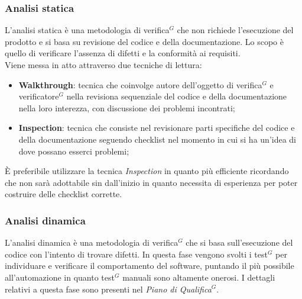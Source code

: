 \documentclass[a4paper,10pt]{article}
\begin{document}
\subsubsection{Analisi statica}
L'analisi statica è una metodologia di verifica$^G$ che non richiede l'esecuzione del prodotto e si basa su revisione del codice e della documentazione.
Lo scopo è quello di verificare l'assenza di difetti e la conformità ai requisiti. \\
Viene messa in atto attraverso due tecniche di lettura: 
\begin{itemize}
  \item \textbf{Walkthrough}: tecnica che coinvolge autore dell'oggetto di verifica$^G$ e verificatore$^G$ nella revisiona sequenziale del codice e
  della documentazione nella loro interezza, con discussione dei problemi incontrati;
  \item \textbf{Inspection}: tecnica che consiste nel revisionare parti specifiche del codice e della documentazione seguendo checklist nel momento 
  in cui si ha un'idea di dove possano esserci problemi;
\end{itemize}
È preferibile utilizzare la tecnica \textit{Inspection} in quanto più efficiente ricordando che non sarà adottabile sin dall'inizio
in quanto necessita di esperienza per poter costruire delle checklist corrette.
\subsubsection{Analisi dinamica}
L'analisi dinamica è una metodologia di verifica$^G$ che si basa sull'esecuzione del codice con l'intento di trovare difetti.
In questa fase vengono svolti i test$^G$ per individuare e verificare il comportamento del software, puntando il più possibile
all'automazione in quanto test$^G$ manuali sono altamente onerosi. I dettagli relativi a questa fase sono presenti nel \textit{Piano di Qualifica$^G$}.
\end{document}
